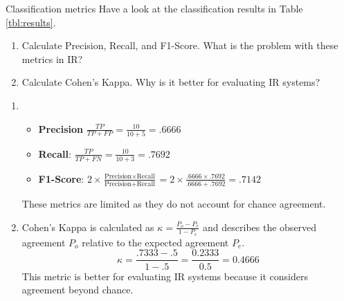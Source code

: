 \documentclass{article}
\begin{document}
\begin{exercise}{Classification metrics}\label{ex:class-metrics}
  Have a look at the classification results in Table \ref{tbl:results}. 

  \begin{enumerate}
    \item Calculate Precision, Recall, and F1-Score. What is the problem with these metrics in IR?
    \item Calculate Cohen's Kappa. Why is it better for evaluating IR systems?
  \end{enumerate}
    
  \begin{solution}
    \begin{enumerate}
      \item \begin{itemize}
        \item \textbf{Precision} $\frac{TP}{TP + FP} = \frac{10}{10+5} = .6666$
        \item \textbf{Recall}: $\frac{TP}{TP + FN} = \frac{10}{10+3} = .7692$
        \item \textbf{F1-Score}: $2 \times \frac{\text{Precision} \times \text{Recall}}{\text{Precision} + \text{Recall}} = 2 \times \frac{.6666 \times .7692}{.6666 + .7692} = .7142$
        \end{itemize}
        These metrics are limited as they do not account for chance agreement.
      \item Cohen's Kappa is calculated as $\kappa = \frac{P_o - P_e}{1 - P_e}$ and describes the observed agreement $P_o$ relative to the expected agreement $P_e$.
        \[ \kappa = \frac{.7333-.5}{1-.5} = \frac{0.2333}{0.5} = 0.4666 \]
        This metric is better for evaluating IR systems because it considers agreement beyond chance.
    \end{enumerate}
  \end{solution}
\end{exercise}
\end{document}
